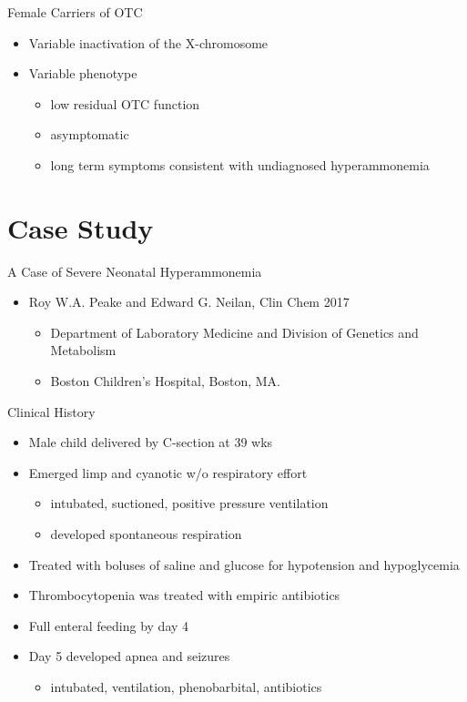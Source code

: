 \documentclass[presentation, smaller]{beamer}
\begin{document}
\begin{frame}[label={sec:orgheadline9}]{Female Carriers of OTC}
\begin{itemize}
\item Variable inactivation of the X-chromosome
\item Variable phenotype
\begin{itemize}
\item low residual OTC function
\item asymptomatic
\item long term symptoms consistent with undiagnosed hyperammonemia
\end{itemize}
\end{itemize}
\end{frame}

\section{Case Study}
\label{sec:orgheadline18}
\begin{frame}[label={sec:orgheadline11}]{A Case of Severe Neonatal Hyperammonemia}
\begin{itemize}
\item Roy W.A. Peake and Edward G. Neilan, Clin Chem 2017
\begin{itemize}
\item Department of Laboratory Medicine and Division of Genetics and Metabolism
\item Boston Children’s Hospital, Boston, MA.
\end{itemize}
\end{itemize}
\end{frame}
\begin{frame}[label={sec:orgheadline12}]{Clinical History}
\begin{itemize}
\item Male child delivered by C-section at 39 wks
\item Emerged limp and cyanotic w/o respiratory effort
\begin{itemize}
\item intubated, suctioned, positive pressure ventilation
\item developed spontaneous respiration
\end{itemize}
\item Treated with boluses of saline and glucose for hypotension and hypoglycemia
\item Thrombocytopenia was treated with empiric antibiotics

\item Full enteral feeding by day 4

\item Day 5 developed apnea and seizures

\begin{itemize}
\item intubated, ventilation, phenobarbital, antibiotics
\end{itemize}
\end{itemize}
\end{frame}
\end{document}
